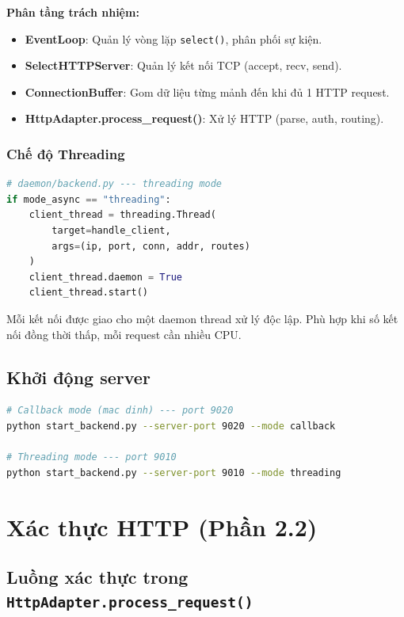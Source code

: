 \documentclass[12pt,a4paper]{article}
\begin{document}
\textbf{Phân tầng trách nhiệm:}
\begin{itemize}
  \item \textbf{EventLoop}: Quản lý vòng lặp \texttt{select()}, phân phối sự kiện.
  \item \textbf{SelectHTTPServer}: Quản lý kết nối TCP (accept, recv, send).
  \item \textbf{ConnectionBuffer}: Gom dữ liệu từng mảnh đến khi đủ 1 HTTP request.
  \item \textbf{HttpAdapter.process\_request()}: Xử lý HTTP (parse, auth, routing).
\end{itemize}

\subsubsection*{Chế độ Threading}

\begin{lstlisting}[language=Python]
# daemon/backend.py --- threading mode
if mode_async == "threading":
    client_thread = threading.Thread(
        target=handle_client,
        args=(ip, port, conn, addr, routes)
    )
    client_thread.daemon = True
    client_thread.start()
\end{lstlisting}

Mỗi kết nối được giao cho một daemon thread xử lý độc lập. Phù hợp khi số kết nối đồng thời thấp, mỗi request cần nhiều CPU.

\subsection{Khởi động server}

\begin{lstlisting}[language=bash]
# Callback mode (mac dinh) --- port 9020
python start_backend.py --server-port 9020 --mode callback

# Threading mode --- port 9010
python start_backend.py --server-port 9010 --mode threading
\end{lstlisting}

\section{Xác thực HTTP (Phần 2.2)}

\subsection{Luồng xác thực trong \texttt{HttpAdapter.process\_request()}}
\end{document}
